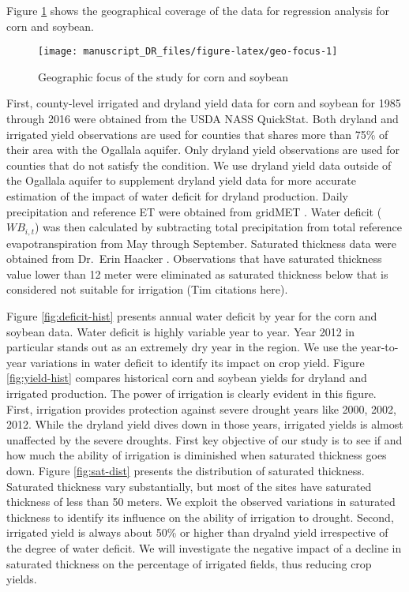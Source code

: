 \documentclass[
]{article}
\begin{document}
Figure \ref{fig:geo-focus} shows the geographical coverage of the data for regression analysis for corn and soybean.

\begin{figure}

{\centering \texttt{[image: manuscript\_DR\_files/figure-latex/geo-focus-1]} 

}

\caption{Geographic focus of the study for corn and soybean}\label{fig:geo-focus}
\end{figure}

First, county-level irrigated and dryland yield data for corn and soybean for 1985 through 2016 were obtained from the USDA NASS QuickStat. Both dryland and irrigated yield observations are used for counties that shares more than 75\% of their area with the Ogallala aquifer. Only dryland yield observations are used for counties that do not satisfy the condition. We use dryland yield data outside of the Ogallala aquifer to supplement dryland yield data for more accurate estimation of the impact of water deficit for dryland production. Daily precipitation and reference ET were obtained from gridMET \citep{Abatzoglou2013}. Water deficit (\(WB_{i,t}\)) was then calculated by subtracting total precipitation from total reference evapotranspiration from May through September. Saturated thickness data were obtained from Dr.~Erin Haacker \citep{haacker2016water}. Observations that have saturated thickness value lower than 12 meter were eliminated as saturated thickness below that is considered not suitable for irrigation (Tim citations here).

Figure \ref{fig:deficit-hist} presents annual water deficit by year for the corn and soybean data. Water deficit is highly variable year to year. Year 2012 in particular stands out as an extremely dry year in the region. We use the year-to-year variations in water deficit to identify its impact on crop yield. Figure \ref{fig:yield-hist} compares historical corn and soybean yields for dryland and irrigated production. The power of irrigation is clearly evident in this figure. First, irrigation provides protection against severe drought years like 2000, 2002, 2012. While the dryland yield dives down in those years, irrigated yields is almost unaffected by the severe droughts. First key objective of our study is to see if and how much the ability of irrigation is diminished when saturated thickness goes down. Figure \ref{fig:sat-dist} presents the distribution of saturated thickness. Saturated thickness vary substantially, but most of the sites have saturated thickness of less than 50 meters. We exploit the observed variations in saturated thickness to identify its influence on the ability of irrigation to drought. Second, irrigated yield is always about 50\% or higher than dryalnd yield irrespective of the degree of water deficit. We will investigate the negative impact of a decline in saturated thickness on the percentage of irrigated fields, thus reducing crop yields.
\end{document}

